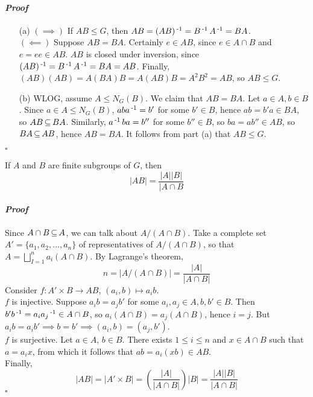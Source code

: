 \documentclass[11pt]{book}
\theoremstyle{definition}   \newtheorem{defn}[counter]{Definition} %
\DeclareMathOperator{\ra}{\rightarrow}   \DeclareMathOperator{\Poly}{\mathbf{P}}   \DeclareMathOperator{\spn}{\textnormal{span}}   \DeclareMathOperator{\aut}{\textnormal{Aut}}
\newenvironment{prf}{\paragraph{\textit{Proof}}}{\hfill$\square$}
\newcommand{\vs}{\vspace{8pt}}
\numberwithin{counter}{chapter}
\begin{document}
\begin{prf}
\begin{enumerate}
\item[(a)] $(\implies)$ If $AB \leq G$, then $AB = (AB)\operatorname{^{-1}} = B\operatorname{^{-1}} A\operatorname{^{-1}} = BA$. \\
$(\impliedby)$ Suppose $AB = BA$. Certainly $e \in AB$, since $e \in A\cap B$ and $e = ee \in AB$. $AB$ is closed under inversion, since $(AB)\operatorname{^{-1}} = B\operatorname{^{-1}} A\operatorname{^{-1}} = BA = AB$. Finally, $(AB)(AB) = A(BA)B = A(AB)B = A^2B^2 = AB$, so $AB \leq G$.

\item[(b)] WLOG, assume $A \leq N_G(B)$. We claim that $AB = BA$. Let $a \in A, b \in B$. Since $a \in A \leq N_G(B)$, $aba\operatorname{^{-1}} = b'$ for some $b' \in B$, hence $ab = b'a \in BA$, so $AB \operatorname{\subseteq} BA$. Similarly, $a\operatorname{^{-1}} ba = b''$ for some $b'' \in B$, so $ba = ab'' \in AB$, so $BA \operatorname{\subseteq} AB$, hence $AB = BA$. It follows from part (a) that $AB \leq G$.
\end{enumerate}
\end{prf}

\vs

\begin{lemma}
If $A$ and $B$ are finite subgroups of $G$, then
	\[|AB| = \frac{|A||B|}{|A\cap B} \]
\end{lemma}

\begin{prf}
Since $A \cap B \operatorname{\subseteq} A$, we can talk about $A / (A \cap B)$. Take a complete set $A' = \{a_1,a_2,\dots,a_n\}$ of representatives of $A/(A\cap B)$, so that $A = \bigsqcup_{I=1}^n a_i(A\cap B)$. By Lagrange's theorem,
	\[n = \left| A/(A\cap B) \right| = \frac{|A|}{|A\cap B|} \]
Consider $f : A' \times B \ra AB$, $(a_i,b) \mapsto a_ib$. \\

$f$ is injective. Suppose $a_ib = a_jb'$ for some $a_i,a_j \in A, b,b' \in B$. Then $b'b\operatorname{^{-1}} = a_ia_j\operatorname{^{-1}} \in A \cap B$, so $a_i (A\cap B) = a_j (A \cap B)$, hence $i = j$. But $a_i b = a_i b' \implies b = b' \implies (a_i,b) = (a_j,b')$. \\

$f$ is surjective. Let $a \in A$, $b \in B$. There exists $1 \leq i \leq n$ and $x \in A\cap B$ such that $a = a_i x$, from which it follows that $ab = a_i (xb) \in AB$. \\

Finally, \[|AB| = |A' \times B| = \left( \frac{|A|}{|A\cap B|} \right) |B| = \frac{|A||B|}{|A \cap B|} \]
\end{prf}
\end{document}
